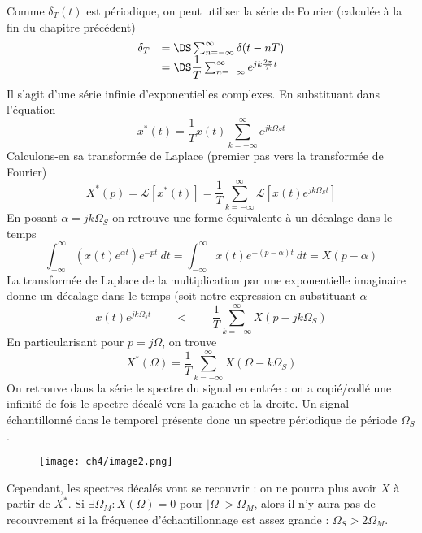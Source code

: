 	Comme $\delta_T(t)$ est périodique, on peut utiliser la série de Fourier (calculée à la fin 
	du chapitre précédent)
	\begin{equation}
	\begin{array}{ll}
	\delta_T &=\DS \sum_{n=-\infty}^\infty \delta(t-nT)\\
	&= \DS \dfrac{1}{T}\sum_{n=-\infty}^\infty e^{jk\frac{2\pi}{T}t}
	\end{array}
	\end{equation}
	Il s'agit d'une série infinie d'exponentielles complexes. En substituant dans l'équation
	\begin{equation}
	x^*(t) = \frac{1}{T}x(t)\sum_{k=-\infty}^\infty e^{jk\Omega_St}
	\end{equation}
	Calculons-en sa transformée de Laplace (premier pas vers la transformée de Fourier)
	\begin{equation}
	X^*(p) = \mathcal{L}[x^*(t)] = \dfrac{1}{T}\sum_{k=-\infty}^\infty \mathcal{L}\left[x(t)
	e^{jk\Omega_St}\right]
	\end{equation}
	En posant $\alpha = jk\Omega_S$ on retrouve une forme équivalente à un décalage dans le temps
	\begin{equation}
	\int_{-\infty}^\infty \left(x(t)e^{\alpha t}\right)e^{-pt}\ dt = \int_{-\infty}^\infty x(t) 
	e^{-(p-\alpha)t}\ dt = X(p-\alpha)
	\end{equation}
	La transformée de Laplace de la multiplication par une exponentielle imaginaire donne un 
	décalage dans le temps (soit notre expression en substituant $\alpha$
	\begin{equation}
	x(t)e^{jk\Omega_st}\qquad \lt\qquad \frac{1}{T}\sum_{k=-\infty}^\infty X(p-jk\Omega_S)
	\end{equation}
	En particularisant pour $p = j\Omega$, on trouve
	\begin{equation}
	X^*(\Omega) = \dfrac{1}{T}\sum_{k=-\infty}^\infty X(\Omega-k\Omega_S)
	\end{equation}
	On retrouve dans la série le spectre du signal en entrée : on a copié/collé une infinité 
	de fois le spectre décalé vers la gauche et la droite. Un signal échantillonné dans le temporel 
	présente donc un spectre périodique de période $\Omega_S$.
	\begin{wrapfigure}[10]{l}{8.5cm}
	\vspace{-5mm}
	\texttt{[image: ch4/image2.png]}
	\label{fig:rec}
	\end{wrapfigure}	
	Cependant, les spectres décalés vont se recouvrir : on ne pourra plus avoir $X$ à partir 
	de $X^*$. Si $\exists \Omega_M : X(\Omega) = 0$ pour $|\Omega|>\Omega_M$, alors il n'y aura 
	pas de recouvrement si la fréquence d’échantillonnage est assez grande : $\Omega_S > 2\Omega_M$.\\
	
